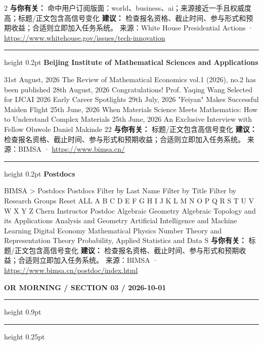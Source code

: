 \documentclass[10.5pt]{ctexart}
\begin{document}
\begin{multicols}{2}
\textbf{与你有关：} 命中用户订阅版面：world、business、ai；来源接近一手且权威度高；标题/正文包含高信号变化
\textbf{建议：} 检查报名资格、截止时间、参与形式和预期收益；合适则立即加入任务系统。
{\footnotesize\color{ormuted} 来源：White House Presidential Actions · \url{https://www.whitehouse.gov/issues/tech-innovation}}
\vspace{2mm}
\hrule height 0.2pt
\vspace{2mm}
{\large\bfseries Beijing Institute of Mathematical Sciences and Applications}\par
31st August, 2026 The Review of Mathematical Economics vol.1 (2026), no.2 has been published 28th August, 2026 Congratulations! Prof. Yaqing Wang Selected for IJCAI 2026 Early Career Spotlights 29th July, 2026 "Feiyan" Makes Successful Maiden Flight 25th June, 2026 When Materials Science Meets Mathematics: How to Understand Complex Materials 25th June, 2026 An Exclusive Interview with Fellow Oluwole Daniel Makinde 22
\textbf{与你有关：} 标题/正文包含高信号变化
\textbf{建议：} 检查报名资格、截止时间、参与形式和预期收益；合适则立即加入任务系统。
{\footnotesize\color{ormuted} 来源：BIMSA · \url{https://www.bimsa.cn/}}
\vspace{2mm}
\hrule height 0.2pt
\vspace{2mm}
{\large\bfseries Postdocs}\par
BIMSA > Postdocs Postdocs Filter by Last Name Filter by Title Filter by Research Groups Reset ALL A B C D E F G H I J K L M N O P Q R S T U V W X Y Z Chern Instructor Postdoc Algebraic Geometry Algebraic Topology and its Applications Analysis and Geometry Artificial Intelligence and Machine Learning Digital Economy Mathematical Physics Number Theory and Representation Theory Probability, Applied Statistics and Data S
\textbf{与你有关：} 标题/正文包含高信号变化
\textbf{建议：} 检查报名资格、截止时间、参与形式和预期收益；合适则立即加入任务系统。
{\footnotesize\color{ormuted} 来源：BIMSA · \url{https://www.bimsa.cn/postdoc/index.html}}
\end{multicols}
\newpage
{\small\bfseries OR MORNING / SECTION 03 / 2026-10-01}
\vspace{2mm}
\hrule height 0.9pt
\vspace{1.5mm}
\hrule height 0.25pt
\vspace{4mm}
\end{document}
